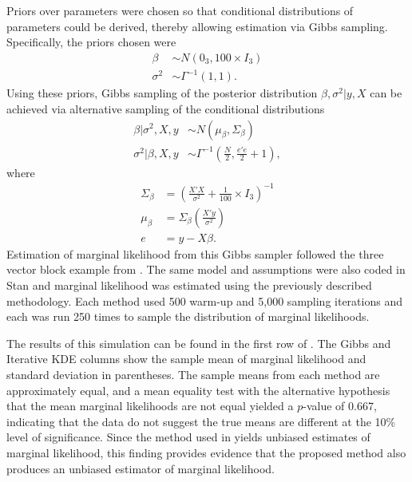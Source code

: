 \documentclass[twocolumn]{article}
\begin{document}
Priors over parameters were chosen so that conditional distributions of parameters could be derived, thereby allowing estimation via Gibbs sampling. Specifically, the priors chosen were
\begin{align}
	\beta &\sim N(0_3, 100\times I_3)\\
	\sigma^2 &\sim \Gamma^{-1}(1, 1).
\end{align}
Using these priors, Gibbs sampling of the posterior distribution $\beta, \sigma^2|y, X$ can be achieved via alternative sampling of the conditional distributions
\begin{align}
	\beta|\sigma^2, X, y &\sim N(\mu_\beta, \Sigma_\beta) \\
	\sigma^2|\beta, X, y &\sim \Gamma^{-1}\left(\frac{N}2, \frac{e'e}2 + 1\right),
\end{align}
where
\begin{align}
	\Sigma_\beta &= \left(\frac{X'X}{\sigma^2} + \frac1{100}\times I_3\right)^{-1}\\
	\mu_\beta &= \Sigma_\beta\left(\frac{X'y}{\sigma^2}\right)\\
	e &= y - X\beta.
\end{align}
Estimation of marginal likelihood from this Gibbs sampler followed the three vector block example from \cite{Chib}. The same model and assumptions were also coded in Stan and marginal likelihood was estimated using the previously described methodology. Each method used 500 warm-up and 5,000 sampling iterations and each was run 250 times to sample the distribution of marginal likelihoods.

The results of this simulation can be found in the first row of . The Gibbs and Iterative KDE columns show the sample mean of marginal likelihood and standard deviation in parentheses. The sample means from each method are approximately equal, and a mean equality test with the alternative hypothesis that the mean marginal likelihoods are not equal yielded a $p$-value of 0.667, indicating that the data do not suggest the true means are different at the 10\% level of significance. Since the method used in \cite{Chib} yields unbiased estimates of marginal likelihood, this finding provides evidence that the proposed method also produces an unbiased estimator of marginal likelihood.
\end{document}
